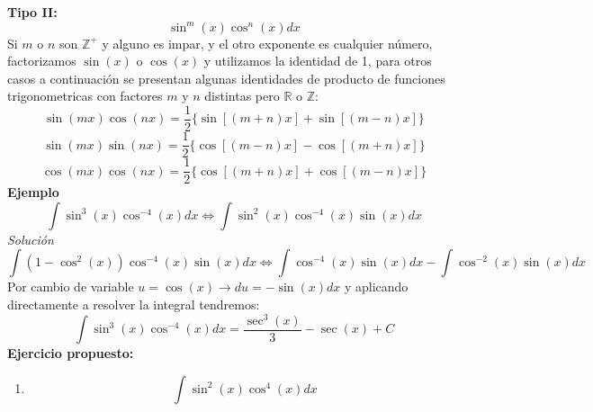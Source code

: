 \documentclass[10pt,executivepaper]{article}
\begin{document}
\textbf{Tipo II:}
\[\sin^{m}(x)\cos^{n}(x)dx\]
Si $m$ o $n$ son $\mathbb{Z^{+}}$ y alguno es impar, y el otro exponente es cualquier número, factorizamos $\sin(x)$ o $\cos(x)$ y utilizamos la identidad de 1, para otros casos a continuación se presentan algunas identidades de producto de funciones trigonometricas con factores $m$ y $n$ distintas pero $\mathbb{R}$ o $\mathbb{Z}$:
\[\sin(mx)\cos(nx)=\frac{1}{2}\{\sin[(m+n)x]+\sin[(m-n)x]\}\]
\[\sin(mx)\sin(nx)=\frac{1}{2}\{\cos[(m-n)x]-\cos[(m+n)x]\}\]
\[\cos(mx)\cos(nx)=\frac{1}{2}\{\cos[(m+n)x]+\cos[(m-n)x]\}\]
\textbf{Ejemplo}
\[\int\sin^{3}(x)\cos^{-4}(x)dx \Leftrightarrow \int\sin^{2}(x)\cos^{-4}(x)\sin(x)dx\]
\textit{Solución}
\[\int(1-\cos^{2}(x))\cos^{-4}(x)\sin(x)dx \Leftrightarrow \int\cos^{-4}(x)\sin(x)dx - \int\cos^{-2}(x)\sin(x)dx\]
Por cambio de variable $u=\cos(x) \rightarrow du=-\sin(x)dx$ y aplicando directamente a resolver la integral tendremos:
\[\int\sin^{3}(x)\cos^{-4}(x)dx = \frac{\sec^{3}(x)}{3}-\sec(x) +C\]
\textbf{Ejercicio propuesto:}
\begin{enumerate}
  \item \[\int\sin^{2}(x)\cos^{4}(x)dx\]
\end{enumerate}
\printindex
\end{document}
